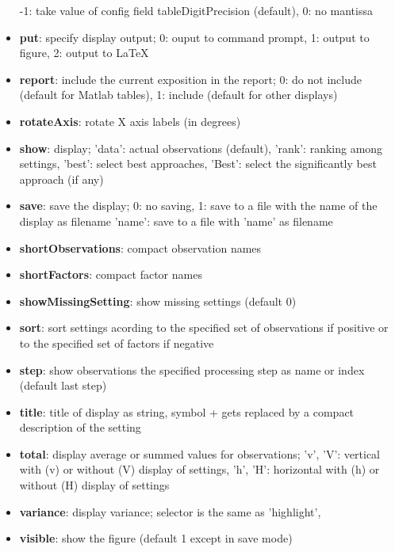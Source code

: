 \documentclass[a4paper,fleqn]{tufte-handout}
\begin{document}
\begin{itemize}
           -1: take value of config field tableDigitPrecision (default),
           0: no mantissa                  
\item \textbf{put}:   specify display output;
    	0: ouput to command prompt,
    	1: output to figure,
    	2: output to \LaTeX 
\item \textbf{report}:  include the current exposition in the report;
       0: do not include (default for Matlab tables),  
       1: include (default for other displays)                   
\item \textbf{rotateAxis}: rotate X axis labels (in degrees)   
\item \textbf{show}: display;
        'data': actual observations (default),
        'rank': ranking among settings,
        'best': select best approaches,
        'Best': select the significantly best approach (if any)                 
\item \textbf{save}: save the display;
    	0: no saving,
    	1: save to a file with the name of the display as filename
    	'name': save to a file with 'name' as filename
\item \textbf{shortObservations}: compact observation names                 
\item \textbf{shortFactors}: compact factor names  
\item \textbf{showMissingSetting}:  show missing settings (default 0)                
\item \textbf{sort}:   sort settings acording to the specified set of observations if
        positive or to the specified set of factors if negative
\item \textbf{step}: show observations the specified processing step as name or
    index (default last step)                 
\item \textbf{title}: title of display as string,
    	symbol + gets replaced by a compact description of the setting  
\item \textbf{total}:  display average  or summed values for observations;
        'v', 'V': vertical with (v) or without (V) display of settings,
        'h', 'H': horizontal with (h) or without (H) display of settings                
\item \textbf{variance}:   display variance;
    	selector is the same as 'highlight',
\item \textbf{visible}: show the figure (default 1 except in save mode)                    
\end{itemize}

%
%
%
%
%
%
%
%
%
%
%
%
%
\end{document}
